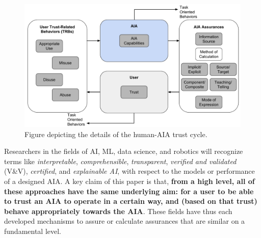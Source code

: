 %
%
    \begin{figure}[t]%
        \centering
        \includegraphics[width=0.6\linewidth]{Figures/RefinedTrust_one_way.pdf}
        \caption{Figure depicting the details of the human-AIA trust cycle.}
        \label{fig:refined_trust}
    \end{figure}

     


    Researchers in the fields of AI, ML, data science, and robotics will recognize terms like \emph{interpretable}, \emph{comprehensible}, \emph{transparent}, \emph{verified and validated} (V\&V), \emph{certified}, and \emph{explainable AI}, with respect to the models or performance of a designed AIA. A key claim of this paper is that, \textbf{from a high level, all of these approaches have the same underlying aim: for a user to be able to trust an AIA to operate in a certain way, and (based on that trust) behave appropriately towards the AIA}. These fields have thus each developed mechanisms to assure or calculate assurances that are similar on a fundamental level. 
